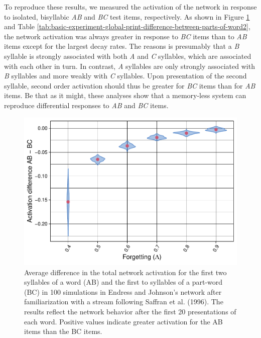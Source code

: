 \documentclass[
]{article}
\begin{document}
To reproduce these results, we measured the activation of the network in
response to isolated, bisyllabic \emph{AB} and \emph{BC} test items,
respectively. As shown in Figure
\ref{fig:basic-experiment-global-print-act-after-2syll-plot} and Table
\ref{tab:basic-experiment-global-print-difference-between-parts-of-word2},
the network activation was always greater in response to \emph{BC} items
than to \emph{AB} items except for the largest decay rates. The reasons
is presumably that a \emph{B} syllable is strongly associated with both
\emph{A} and \emph{C} syllables, which are associated with each other in
turn. In contrast, \emph{A} syllables are only strongly associated with
\emph{B} syllables and more weakly with \emph{C} syllables. Upon
presentation of the second syllable, second order activation should thus
be greater for \emph{BC} items than for \emph{AB} items. Be that as it
might, these analyses show that a memory-less system can reproduce
differential responses to \emph{AB} and \emph{BC} items.

\begin{figure}
\includegraphics[width=1\linewidth]{tp_model_entrainment_files/figure-latex/basic-experiment-global-print-act-after-2syll-plot-1} \caption{Average difference in the total network activation for the first two syllables of a word (AB) and the first to syllables of a part-word (BC)  in 100 simulations in Endress and Johnson's network after  familiarization with a stream following Saffran et al. (1996). The results reflect the network behavior after the first 20 presentations of each word. Positive values indicate greater activation for the AB items than the BC items.}\label{fig:basic-experiment-global-print-act-after-2syll-plot}
\end{figure}
\end{document}

